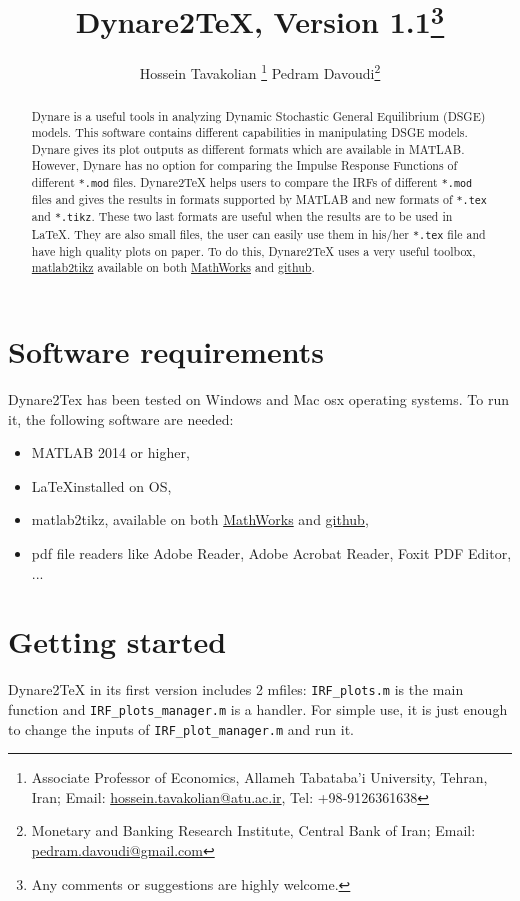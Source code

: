 \documentclass[11pt,a4paper]{article}
\title{Dynare2TeX, Version 1.1\thanks{Any comments or suggestions are highly welcome.}}
\author{
Hossein Tavakolian \footnote{Associate Professor of Economics, Allameh Tabataba'i University, Tehran, Iran; Email: \href{hossein.tavakolian@atu.ac.ir}{hossein.tavakolian@atu.ac.ir}, Tel: +98-9126361638}\hspace{1cm}  
Pedram Davoudi\footnote{Monetary and Banking Research Institute, Central Bank of Iran; Email: \href{pedram.davoudi@gmail.com}{pedram.davoudi@gmail.com}}}
\begin{document}
\maketitle
\begin{abstract}
Dynare is a useful tools in analyzing Dynamic Stochastic General Equilibrium (DSGE) models. This software contains different capabilities in manipulating DSGE models. Dynare gives its plot outputs as different formats which are available in MATLAB. However, Dynare has no option for comparing the Impulse Response Functions of different \texttt{*.mod} files. Dynare2TeX helps users to compare the IRFs of different \texttt{*.mod} files and gives the results in formats supported by MATLAB and new formats of \texttt{*.tex} and \texttt{*.tikz}. These two last formats are useful when the results are to be used in \LaTeX. They are also small files, the user can easily use them in his/her \texttt{*.tex} file and have high quality plots on paper. To do this, Dynare2TeX uses a very useful toolbox, \href{<http://www.mathworks.com/matlabcentral/fileexchange/22022-matlab2tikz-matlab2tikz>}{matlab2tikz} available on both \href{<http://www.mathworks.com/matlabcentral>}{MathWorks} and \href{<https://github.com/matlab2tikz/matlab2tikz>}{github}.
\end{abstract}

\section{Software requirements}
Dynare2Tex has been tested on Windows and Mac osx operating systems. To run it, the following software are needed:
\begin{itemize}
	\item 
	MATLAB 2014 or higher,
	\item 
	\LaTeX installed on OS,
	\item 
	matlab2tikz, available on both \href{<http://www.mathworks.com/matlabcentral>}{MathWorks} and \href{<https://github.com/matlab2tikz/matlab2tikz>}{github},
	\item
	pdf file readers like Adobe Reader, Adobe Acrobat Reader, Foxit PDF Editor, ...
\end{itemize}

\section{Getting started}
Dynare2TeX in its first version includes 2 mfiles: \texttt{IRF\_plots.m} is the main function and \texttt{IRF\_plots\_manager.m} is a handler. For simple use, it is just enough to change the inputs of \texttt{IRF\_plot\_manager.m} and run it. 
\end{document}
